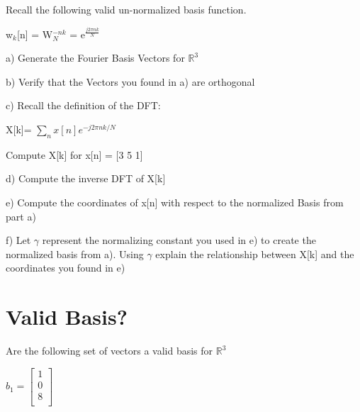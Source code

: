 \documentclass[11pt]{article}
\begin{document}
Recall the following valid un-normalized basis function.
\begin{center}
w$_k$[n] = W$_N^{-nk}$ = e$^{\frac{j2\pi nk}{N}}$
\end{center}

a) Generate the Fourier Basis Vectors for $\mathbb{R}^3$

\vspace{2mm}

b) Verify that the Vectors you found in a) are orthogonal


\newpage

c) Recall the definition of the DFT:

\begin{center}

X[k]= $\sum_n x[n] e^{-j2\pi nk/N}$

\end{center}

Compute X[k] for x[n] = [3 5 1]\newline

d) Compute the inverse DFT of X[k]\newline

\vspace{2mm}

e) Compute the coordinates of x[n] with respect to the normalized Basis from part a)\newline
\vspace{2mm}

f) Let $\gamma$ represent the normalizing constant you used in e) to create the normalized basis from a). Using $\gamma$ explain the relationship between X[k] and the coordinates you found in e)


\vspace{3mm}

\section{Valid Basis?}

Are the following set of vectors a valid basis for $\mathbb{R}^3$

\begin{center}

 
$
b_1 = 
\begin{bmatrix}

1 \\
0 \\
8 \\

\end{bmatrix}
$
\end{center}
\end{document}
